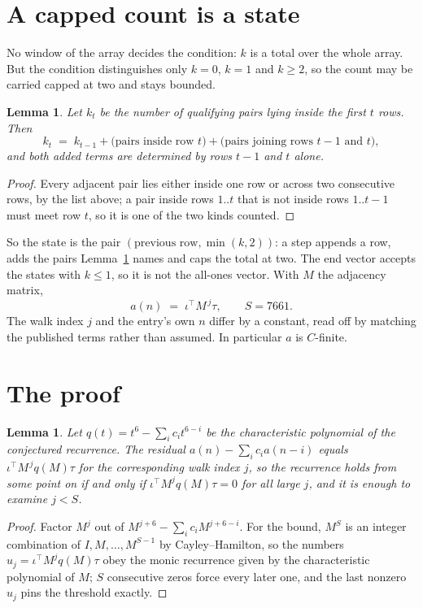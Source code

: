 \documentclass[11pt,a4paper]{article}
\theoremstyle{plain}
\newtheorem{lemma}[theorem]{Lemma}
\theoremstyle{definition}
\begin{document}
\section{A capped count is a state}

No window of the array decides the condition: $k$ is a total over the whole array. But the
condition distinguishes only $k=0$, $k=1$ and $k\ge2$, so the count may be carried capped at
two and stays bounded.

\begin{lemma}\label{lem:cap}
Let $k_t$ be the number of qualifying pairs lying inside the first $t$ rows. Then
\[
k_{t}\;=\;k_{t-1}+\bigl(\text{pairs inside row } t\bigr)
+\bigl(\text{pairs joining rows } t-1 \text{ and } t\bigr),
\]
and both added terms are determined by rows $t-1$ and $t$ alone.
\end{lemma}

\begin{proof}
Every adjacent pair lies either inside one row or across two consecutive rows, by the list
above; a pair inside rows $1..t$ that is not inside rows $1..t-1$ must meet row $t$, so it is
one of the two kinds counted.
\end{proof}

So the state is the pair $(\text{previous row},\min(k,2))$: a step appends a row, adds the
pairs Lemma~\ref{lem:cap} names and caps the total at two. The end vector accepts the states
with $k\le1$, so it is not the all-ones vector. With $M$ the adjacency matrix,
\[
a(n)\;=\;\iota^{\!\top}M^{\,j}\tau ,\qquad S=7661.
\]
The walk index $j$ and the entry's own $n$ differ by a constant, read off by matching the
published terms rather than assumed. In particular $a$ is $C$-finite.

\section{The proof}

\begin{lemma}\label{lem:crit}
Let $q(t)=t^{6}-\sum_i c_it^{6-i}$ be the characteristic polynomial of the
conjectured recurrence. The residual $a(n)-\sum_ic_ia(n-i)$ equals
$\iota^{\!\top}M^{\,j}q(M)\tau$ for the corresponding walk index $j$, so the recurrence
holds from some point on if and only if $\iota^{\!\top}M^{j}q(M)\tau=0$ for all large $j$,
and it is enough to examine $j<S$.
\end{lemma}

\begin{proof}
Factor $M^{j}$ out of $M^{j+6}-\sum_ic_iM^{j+6-i}$. For the bound, $M^{S}$
is an integer combination of $I,M,\dots,M^{S-1}$ by Cayley--Hamilton, so the numbers
$u_j=\iota^{\!\top}M^{j}q(M)\tau$ obey the monic recurrence given by the characteristic
polynomial of $M$; $S$ consecutive zeros force every later one, and the last nonzero $u_j$
pins the threshold exactly.
\end{proof}
\end{document}
